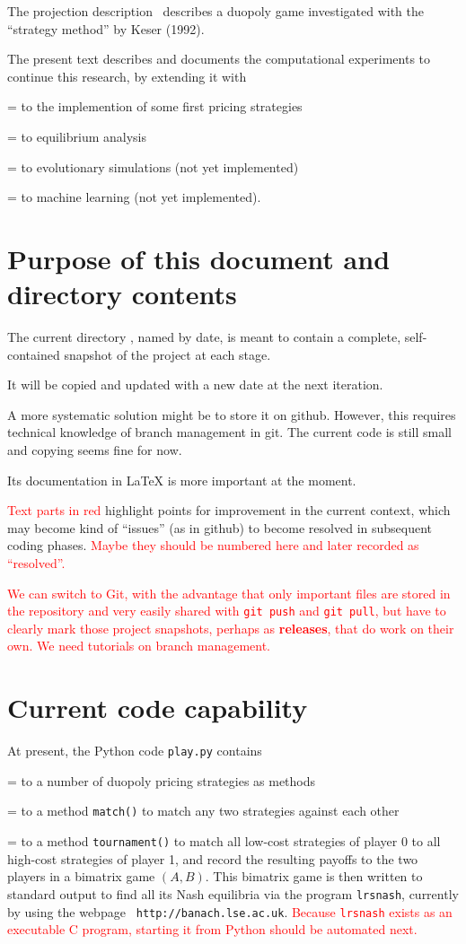 \documentclass[a4paper,12pt]{article}  %
\def\R{\textcolor{red}}
\def\rmitem#1{\par\hangafter=1\hangindent=\einr
  \noindent\hbox to\einr{\ignorespaces#1\hfill}\ignorespaces}
\newcommand\bullitem{\rmitem{\raise.17ex\hbox{\kern7pt\scriptsize$\bullet$}}}
\theoremstyle{definition}
\begin{document}
The projection description \projfile\
describes a duopoly game investigated with the ``strategy
method'' by Keser (1992).

The present text describes and documents the computational
experiments to continue this research, by extending it
with
\bullitem
the implemention of some first pricing strategies
\bullitem
equilibrium analysis
\bullitem
evolutionary simulations (not yet implemented)
\bullitem
machine learning (not yet implemented).

\section{Purpose of this document and directory contents} 

The current directory \dirname, named by date, is meant to
contain a complete, self-contained snapshot of the project
at each stage.

It will be copied and updated with a new date at the next
iteration.

A more systematic solution might be to store it on github.
However, this requires technical knowledge of branch
management in git.
The current code is still small and copying seems fine for
now.

Its documentation in LaTeX is more important at the moment.

\R{Text parts in red} highlight points for improvement in
the current context, which may become kind of ``issues'' (as
in github) to become resolved in subsequent coding phases.
\R{Maybe they should be numbered here and later recorded as
``resolved''.}

\R{We can switch to Git, with the advantage that only
important files are stored in the repository and very easily
shared with {\tt git push} and {\tt git pull}, but have to
clearly mark those project snapshots, perhaps as
\textbf{releases}, that do work on their own.
We need tutorials on branch management.} 

\section{Current code capability} 

At present, the Python code {\tt play.py} contains
\bullitem
a number of duopoly pricing strategies as methods
\bullitem
a method {\tt match()} to match any two strategies against each other
\bullitem
a method {\tt tournament()} to match all low-cost strategies
of player 0 to all high-cost strategies of player 1, and
record the resulting payoffs to the two players in a
bimatrix game $(A,B)$.
This bimatrix game is then written to standard output to
find all its Nash equilibria via the program {\tt lrsnash},
currently by using the webpage {\tt
http://banach.lse.ac.uk}.
\R{Because {\tt lrsnash} exists as an executable C program,
starting it from Python should be automated next.}
\end{document}
